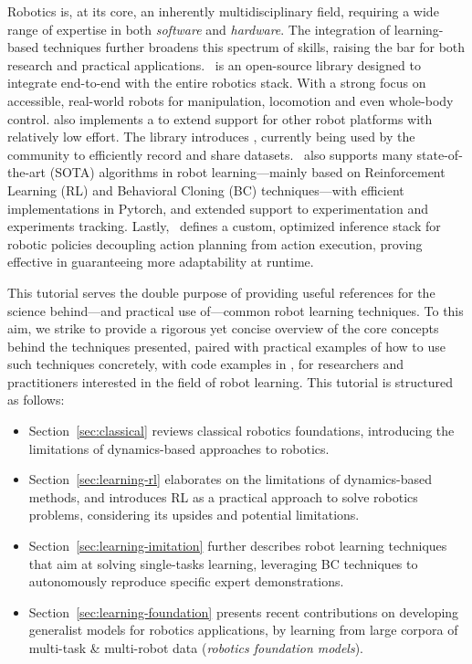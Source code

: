 Robotics is, at its core, an inherently multidisciplinary field, requiring a wide range of expertise in both \emph{software} and \emph{hardware}.
The integration of learning-based techniques further broadens this spectrum of skills, raising the bar for both research and practical applications.
\lerobot~is an open-source library designed to integrate end-to-end with the entire robotics stack.
With a strong focus on accessible, real-world robots  for manipulation, locomotion and even whole-body control.
\lerobot also implements a  to extend support for other robot platforms with relatively low effort. 
The library introduces \lerobotdataset,  currently being used by the community to efficiently record and share datasets.
\lerobot~also supports many state-of-the-art (SOTA) algorithms in robot learning---mainly based on Reinforcement Learning (RL) and Behavioral Cloning (BC) techniques---with efficient implementations in Pytorch, and extended support to experimentation and experiments tracking.
Lastly, \lerobot~defines a custom, optimized inference stack for robotic policies decoupling action planning from action execution, proving effective in guaranteeing more adaptability at runtime.

This tutorial serves the double purpose of providing useful references for the science behind---and practical use of---common robot learning techniques.
To this aim, we strike to provide a rigorous yet concise overview of the core concepts behind the techniques presented, paired with practical examples of how to use such techniques concretely, with code examples in \lerobot, for researchers and practitioners interested in the field of robot learning.
This tutorial is structured as follows:
\begin{itemize}
\item Section~\ref{sec:classical} reviews classical robotics foundations, introducing the limitations of dynamics-based approaches to robotics.
\item Section~\ref{sec:learning-rl} elaborates on the limitations of dynamics-based methods, and introduces RL as a practical approach to solve robotics problems, considering its upsides and potential limitations.
\item Section~\ref{sec:learning-imitation} further describes robot learning techniques that aim at solving single-tasks learning, leveraging BC techniques to autonomously reproduce specific expert demonstrations.
\item Section~\ref{sec:learning-foundation} presents recent contributions on developing generalist models for robotics applications, by learning from large corpora of multi-task \& multi-robot data (\emph{robotics foundation models}).
\end{itemize}

